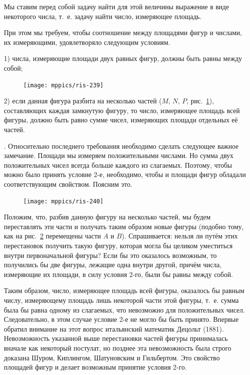 \documentclass[oneside]{book}
\begin{document}
Мы ставим перед собой задачу найти для этой величины выражение в виде некоторого числа, т.~е. задачу найти число, измеряющее площадь.

При этом мы требуем, чтобы соотношение между площадями фигур и числами, их измеряющими, удовлетворяло следующим условиям.

1) числа, измеряющие площади двух равных фигур, должны быть равны между собой; 

\begin{figure}
\centering
\texttt{[image: mppics/ris-239]}
\caption{}\label{1938/ris-239}
\end{figure}

2) если данная фигура разбита на несколько частей ($M$, $N$, $P$, рис.~\ref{1938/ris-239}), составляющих каждая замкнутую фигуру, то число, измеряющее площадь всей фигуры, должно быть равно сумме чисел, измеряющих площади отдельных её частей.

\mbox{.}
Относительно последнего требования необходимо сделать следующее важное замечание.
Площади мы измеряем положительными числами.
Но сумма двух положительных чисел всегда больше каждого из слагаемых.
Поэтому, чтобы можно было принять условие 2-е, %
необходимо, чтобы и площади фигур обладали соответствующим свойством.
Поясним это.

\begin{figure}
\centering
\texttt{[image: mppics/ris-240]}
\caption{}\label{1938/ris-240}
\end{figure}

Положим, что, разбив данную фигуру на несколько частей, мы будем переставлять эти части и получать таким образом новые фигуры (подобно тому, как на рис.~\ref{1938/ris-240} перемещены части $A$ и $B$).
Спрашивается:
нельзя ли путём этих перестановок получить такую фигуру, которая могла бы целиком уместиться внутри первоначальной фигуры? Если бы это оказалось возможным, то получились бы две фигуры, лежащие одна внутри другой, причём числа, измеряющие их площади, в силу условия 2-го, %
были бы равны между собой.

Таким образом, число, измеряющее площадь всей фигуры, оказалось бы равным числу, измеряющему площадь лишь некоторой части этой фигуры, т.~е. сумма была бы равна одному из слагаемых, что невозможно для положительных чисел.
Следовательно, в этом случае условие 2-е не могло бы быть принято.
Впервые обратил внимание на этот вопрос итальянский математик Децольт (1881).
Невозможность указанной выше перестановки частей фигуры принималась вначале как некоторый постулат, но позднее эта невозможность была строго доказана Шуром, Киплингом, Шатуновским и Гильбертом.
Это свойство площадей фигур и делает возможным принятие условия 2-го. %
\end{document}
